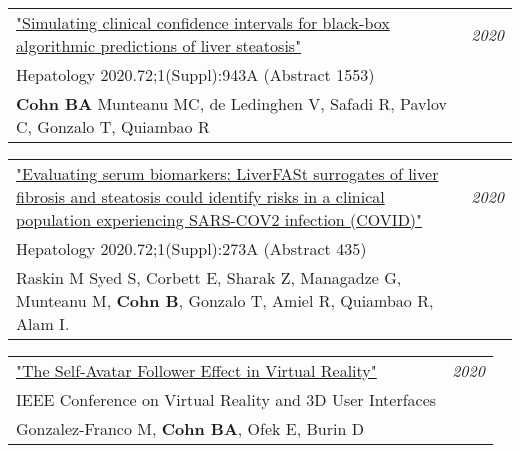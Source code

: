 \documentclass[10pt,a4paper]{article}
\begin{document}


\vspace*{1mm}\noindent\begin{tabularx}{17cm}{X r}
   \href{https://www.aasld.org/}{
   "Simulating clinical confidence intervals for black-box algorithmic predictions of liver steatosis"} & \textit{2020}\\
    Hepatology 2020.72;1(Suppl):943A (Abstract 1553) \\
   \textbf{Cohn BA} Munteanu MC, de Ledinghen V, Safadi R, Pavlov C, Gonzalo T, Quiambao R\\[2mm]
\end{tabularx}


\vspace*{1mm}\noindent\begin{tabularx}{17cm}{X r}
   \href{https://www.aasld.org/}{
   "Evaluating serum biomarkers: LiverFASt surrogates of liver fibrosis and steatosis could identify risks in a clinical population experiencing SARS-COV2 infection (COVID)"} & \textit{2020}\\
   Hepatology 2020.72;1(Suppl):273A (Abstract 435) \\
   Raskin M Syed S, Corbett E, Sharak Z, Managadze G, Munteanu M, \textbf{Cohn B}, Gonzalo T, Amiel R, Quiambao R, Alam I.\\[2mm]
\end{tabularx}


\vspace*{1mm}\noindent\begin{tabularx}{17cm}{X r}
   \href{https://github.com/bc/resume/raw/master/papers/gonzalez-franco_et_al_ieeevr_2020.pdf}{
   "The Self-Avatar Follower Effect in Virtual Reality"} & \textit{2020}\\
    IEEE Conference on Virtual Reality and 3D User Interfaces \\
   Gonzalez-Franco M, \textbf{Cohn BA}, Ofek E, Burin D\\[2mm]
\end{tabularx}
\end{document}
